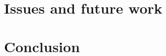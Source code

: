\documentclass[10pt]{icn/sig-alternate-10pt} %
\begin{document}
\section{Issues and future work}



\section{Conclusion}
\end{document}
